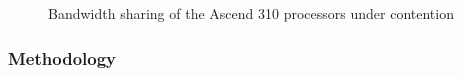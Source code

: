 \documentclass[12pt]{extbook}
\begin{document}
\begin{figure}[tbp]
    \caption{Bandwidth sharing of the Ascend 310 processors under contention}
    \label{fig:bw_sharing}
    \end{figure}

\subsubsection{Methodology}
\end{document}
